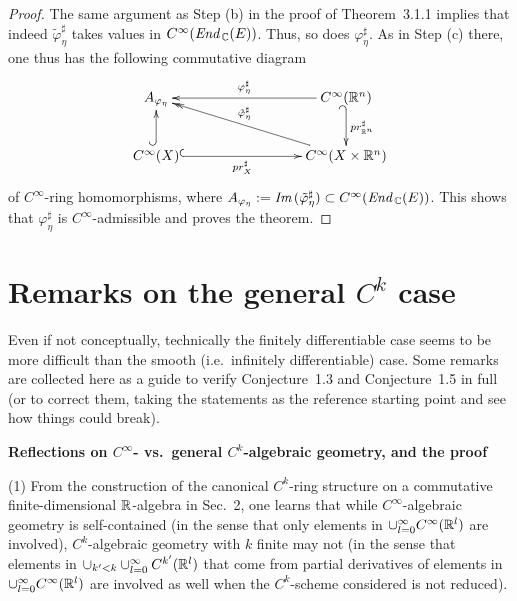 \documentclass[11pt]{article}
\numberwithin{equation}{subsection}
\newcommand{\End}{\mbox{\it End}\,}
\newcommand{\Image}{\mbox{\it Im}\,}
\begin{document}
\begin{proof}
 The same argument as Step (b) in the proof of Theorem~3.1.1
    implies that indeed
     $\tilde{\varphi}_{\eta}^{\sharp}$
   	 takes values in $C^{\infty}(\End_{\Bbb C}(E))$.
 Thus, so does $\varphi_{\eta}^{\sharp}$.	
 As in Step (c) there,
 one thus has the following commutative diagram
     $$
		\xymatrix{
	       A_{\varphi_{\eta}}
			     &&& C^{\infty}({\Bbb R}^n) \ar[lll]_-{\varphi_{\eta}^{\sharp}}
			                                      \ar@{_{(}->}^-{pr_{{\Bbb R}^n}^{\sharp}}[d]   \\
			   \rule{0ex}{1em}C^{\infty}(X) \ar@{^{(}->}[u]
			                                                                 \ar@{^{(}->}[rrr]_-{pr_X^{\sharp}}
				 &&& C^{\infty}(X\times {\Bbb R}^n)
				                                  \ar@{->>}[lllu]_-{\tilde{\varphi}_{\eta}^{\sharp}}		
		}
	 $$
    of $C^{\infty}$-ring homomorphisms,
  where
    $A_{\varphi_{\eta}}:= \Image(\tilde{\varphi}_{\eta}^{\sharp})
	   \subset C^{\infty}(\End_{\Bbb C}(E))$.
 This shows that $\varphi_{\eta}^{\sharp}$ is $C^{\infty}$-admissible and proves the theorem.

\end{proof}





\bigskip

\section{Remarks on the general $C^k$ case}

Even if not conceptually,
technically the finitely differentiable case seems to be more difficult
   than the smooth (i.e.\ infinitely differentiable) case.
Some remarks are collected here as a guide to verify Conjecture~1.3 and Conjecture~1.5 in full
 (or to correct them, taking the statements as the reference starting point and see how things could break).


\bigskip

\begin{flushleft}
{\bf Reflections on $C^{\infty}$- vs.\ general $C^k$-algebraic geometry, and the proof}
\end{flushleft}
%
(1)
 {From} the construction of
    the canonical  $C^k$-ring structure on a commutative finite-dimensional ${\Bbb R}$-algebra
  in Sec.~2,
  one learns that
   while $C^{\infty}$-algebraic geometry is self-contained (in the sense that
     only elements in $\cup_{l=0}^{\infty}C^{\infty}({\Bbb R}^l)$ are involved),
   $C^k$-algebraic geometry with $k$ finite may not
    (in the sense that elements in
	    $\cup_{k^{\prime}<k}\cup_{l=0}^{\infty}
		    C^{k^{\prime}}({\Bbb R}^l)$
	    that come from partial derivatives of elements in
		   $\cup_{l=0}^{\infty}C^{\infty}({\Bbb R}^l)$
        are involved as well
		when the $C^k$-scheme considered is not reduced).
			
\end{document}
